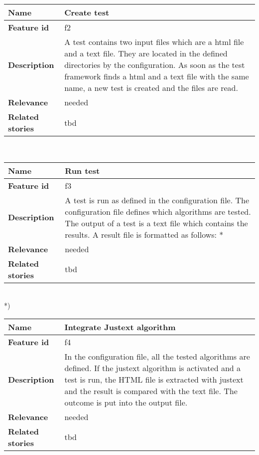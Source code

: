 	\begin{tabular}{ | p{3cm} | p{12cm} |}
	\hline
	\textbf{Name} 				& Create test \\ \hline
	\textbf{Feature id} 		& f2 \\ \hline
	\textbf{Description} 		& A test contains two input files which are a html file and a text file. They are located in the defined directories by the configuration. As soon as the test framework finds a html and a text file with the same name, a new test is created and the files are read.\\ \hline
	\textbf{Relevance} 			& needed \\ \hline
	\textbf{Related stories} 	& tbd \\ \hline
	\end{tabular} \\

	\begin{tabular}{ | p{3cm} | p{12cm} |}
	\hline
	\textbf{Name} 				& Run test \\ \hline
	\textbf{Feature id} 		& f3 \\ \hline
	\textbf{Description} 		& A test is run as defined in the configuration file. The configuration file defines which algorithms are tested. The output of a test is a text file which contains the results. 								A result file is formatted as follows: * \\ \hline
	\textbf{Relevance} 			& needed \\ \hline
	\textbf{Related stories} 	& tbd \\ \hline
	\end{tabular} \\

*)
 

	\begin{tabular}{ | p{3cm} | p{12cm} |}
	\hline
	\textbf{Name} 				& Integrate Justext algorithm \\ \hline
	\textbf{Feature id} 		& f4 \\ \hline
	\textbf{Description} 		& In the configuration file, all the tested algorithms are defined. If the justext algorithm is activated and a test is run, the HTML file is extracted with justext and the result is compared with the text file. The outcome is put into the output file. \\ \hline
	\textbf{Relevance} 			& needed \\ \hline
	\textbf{Related stories} 	& tbd \\ \hline
	\end{tabular} \\


